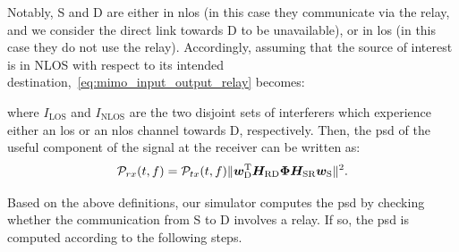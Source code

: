 Notably, S and D are either in \gls{nlos} (in this case they communicate via the relay, and we consider the direct link towards D to be unavailable), or in \gls{los} (in this case they do not use the relay). %
Accordingly, assuming that the source of interest is in NLOS with respect to its intended destination,~\eqref{eq:mimo_input_output_relay} becomes:

where $I_{\textrm{LOS}}$ and $I_{\textrm{NLOS}}$ are the two disjoint sets of interferers which experience either an \gls{los} or an \gls{nlos} channel towards D, respectively.
Then, the \gls{psd} of the useful component of the signal at the receiver can be written as:
\begin{equation}
\label{eq:psd_relay}
\mathcal{P}_{r x}(t, f) = \mathcal{P}_{t x}(t, f) \lVert \bm{w}_{\textrm D}^{\textrm T} \bm{H}_{\textrm {RD}} \bm{\Phi} \bm{H}_{\textrm {SR}} \bm{w}_{\textrm S} \rVert^2.
\end{equation}

Based on the above definitions, our simulator computes the \gls{psd} by checking whether the communication from S to D involves a relay. 
If so, the \gls{psd} is computed according to the following steps.

